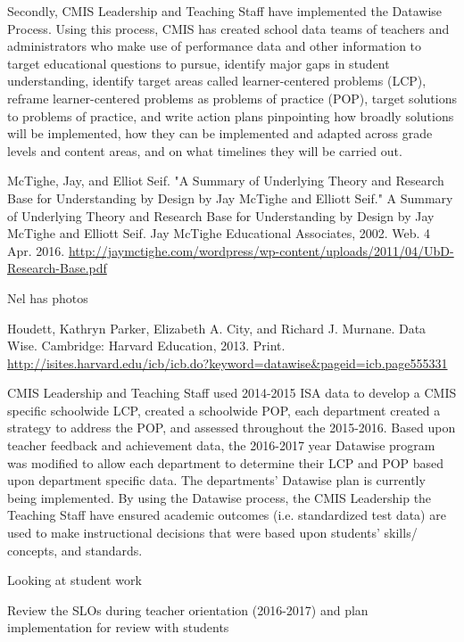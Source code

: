 \documentclass{report}
\begin{document}
\begin{findings}
Secondly, CMIS Leadership and Teaching Staff have implemented the Datawise Process. Using this process, CMIS has created school data teams of teachers and administrators who make use of performance data and other information to target educational questions to pursue, identify major gaps in student understanding, identify target areas called learner-centered problems (LCP), reframe learner-centered problems as problems of practice (POP), target solutions to problems of practice, and write action plans pinpointing how broadly solutions will be implemented, how they can be implemented and adapted across grade levels and content areas, and on what timelines they will be carried out. 
\begin{evidence}
\item McTighe, Jay, and Elliot Seif. "A Summary of Underlying Theory and Research Base for Understanding by Design by Jay McTighe and Elliott Seif." A Summary of Underlying Theory and Research Base for Understanding by Design by Jay McTighe and Elliott Seif. Jay McTighe Educational Associates, 2002. Web. 4 Apr. 2016. \url{http://jaymctighe.com/wordpress/wp-content/uploads/2011/04/UbD-Research-Base.pdf}
\item Nel has photos
\item Houdett, Kathryn Parker, Elizabeth A. City, and Richard J. Murnane. Data Wise. Cambridge: Harvard Education, 2013. Print. \url{http://isites.harvard.edu/icb/icb.do?keyword=datawise&pageid=icb.page555331}
\end{evidence}

CMIS Leadership and Teaching Staff used 2014-2015 ISA data to develop a CMIS specific schoolwide LCP, created a schoolwide POP, each department created a strategy to address the POP, and assessed throughout the 2015-2016. Based upon teacher feedback and achievement data, the 2016-2017 year Datawise program was modified to allow each department to determine their LCP and POP based upon department specific data. The departments’ Datawise plan is currently being implemented. By using the Datawise process, the CMIS Leadership the Teaching Staff have ensured academic outcomes (i.e. standardized test data) are used to make instructional decisions that were based upon students’ skills/ concepts, and standards. 

Looking at student work

Review the SLOs during teacher orientation (2016-2017) and plan implementation for review with students 
\end{findings}
\end{document}
